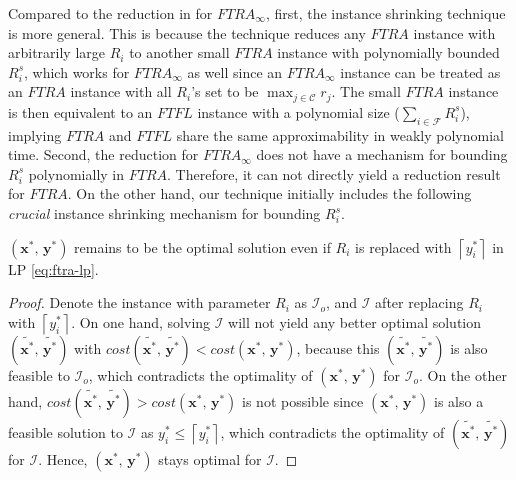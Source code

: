 \documentclass[10pt]{llncs}
\begin{document}
Compared to the reduction in \cite{yan2011newresults} for $FTRA_{\infty}$,
first, the instance shrinking technique is more general. This is because
the technique reduces any $FTRA$ instance with arbitrarily large
$R_{i}$ to another small $FTRA$ instance with polynomially bounded
$R_{i}^{s}$, which works for $FTRA_{\infty}$ as well since an $FTRA_{\infty}$
instance can be treated as an $FTRA$ instance with all $R_{i}$'s
set to be $\max_{j\in\mathcal{C}}r_{j}$. The small $FTRA$ instance
is then equivalent to an $FTFL$ instance with a polynomial size ($\sum_{i\in\mathcal{F}}R_{i}^{s}$),
implying $FTRA$ and $FTFL$ share the same approximability in weakly
polynomial time. Second, the reduction for $FTRA_{\infty}$ does not
have a mechanism for bounding $R_{i}^{s}$ polynomially in $FTRA$.
Therefore, it can not directly yield a reduction result for $FTRA$.
On the other hand, our technique initially includes the following
\textit{crucial} instance shrinking mechanism for bounding $R_{i}^{s}$.
\begin{claim}
$\left(\boldsymbol{x^{*}},\,\boldsymbol{y^{*}}\right)$ remains to
be the optimal solution even if $R_{i}$ is replaced with $\left\lceil y_{i}^{*}\right\rceil $
in LP \eqref{eq:ftra-lp}. \end{claim}
\begin{proof}
Denote the instance with parameter $R_{i}$ as $\mathcal{I}_{o}$,
and $\mathcal{I}$ after replacing $R_{i}$ with $\left\lceil y_{i}^{*}\right\rceil $.
On one hand, solving $\mathcal{I}$ will not yield any better optimal
solution $\left(\tilde{\boldsymbol{x^{*}}},\,\tilde{\boldsymbol{y^{*}}}\right)$
with $cost\left(\tilde{\boldsymbol{x^{*}}},\,\tilde{\boldsymbol{y^{*}}}\right)<cost\left(\boldsymbol{x^{*}},\,\boldsymbol{y^{*}}\right)$,
because this $\left(\tilde{\boldsymbol{x^{*}}},\,\tilde{\boldsymbol{y^{*}}}\right)$
is also feasible to $\mathcal{I}_{o}$, which contradicts the optimality
of $\left(\boldsymbol{x^{*}},\,\boldsymbol{y^{*}}\right)$ for $\mathcal{I}_{o}$.
On the other hand, $cost\left(\tilde{\boldsymbol{x^{*}}},\,\tilde{\boldsymbol{y^{*}}}\right)>cost\left(\boldsymbol{x^{*}},\,\boldsymbol{y^{*}}\right)$
is not possible since $\left(\boldsymbol{x^{*}},\,\boldsymbol{y^{*}}\right)$
is also a feasible solution to $\mathcal{I}$ as $y_{i}^{*}\leq\left\lceil y_{i}^{*}\right\rceil $,
which contradicts the optimality of $\left(\tilde{\boldsymbol{x^{*}}},\,\tilde{\boldsymbol{y^{*}}}\right)$
for $\mathcal{I}$. Hence, $\left(\boldsymbol{x^{*}},\,\boldsymbol{y^{*}}\right)$
stays optimal for $\mathcal{I}$.
\end{proof}
\end{document}
